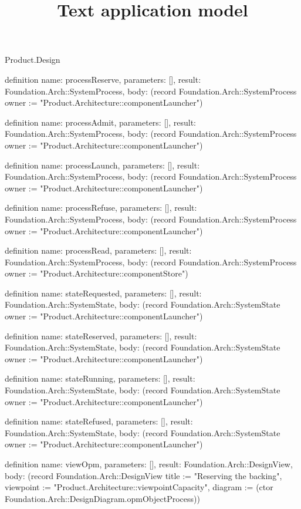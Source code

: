 \begin{lexlean}{Product.Design}
\title{Text application model}
\begin{semanticmodule}
definition{
  name: processReserve, parameters: [], result: Foundation.Arch::SystemProcess,
  body: (record Foundation.Arch::SystemProcess {owner := "Product.Architecture::componentLauncher"})
}

definition{
  name: processAdmit, parameters: [], result: Foundation.Arch::SystemProcess,
  body: (record Foundation.Arch::SystemProcess {owner := "Product.Architecture::componentLauncher"})
}

definition{
  name: processLaunch, parameters: [], result: Foundation.Arch::SystemProcess,
  body: (record Foundation.Arch::SystemProcess {owner := "Product.Architecture::componentLauncher"})
}

definition{
  name: processRefuse, parameters: [], result: Foundation.Arch::SystemProcess,
  body: (record Foundation.Arch::SystemProcess {owner := "Product.Architecture::componentLauncher"})
}

definition{
  name: processRead, parameters: [], result: Foundation.Arch::SystemProcess,
  body: (record Foundation.Arch::SystemProcess {owner := "Product.Architecture::componentStore"})
}

definition{
  name: stateRequested, parameters: [], result: Foundation.Arch::SystemState,
  body: (record Foundation.Arch::SystemState {owner := "Product.Architecture::componentLauncher"})
}

definition{
  name: stateReserved, parameters: [], result: Foundation.Arch::SystemState,
  body: (record Foundation.Arch::SystemState {owner := "Product.Architecture::componentLauncher"})
}

definition{
  name: stateRunning, parameters: [], result: Foundation.Arch::SystemState,
  body: (record Foundation.Arch::SystemState {owner := "Product.Architecture::componentLauncher"})
}

definition{
  name: stateRefused, parameters: [], result: Foundation.Arch::SystemState,
  body: (record Foundation.Arch::SystemState {owner := "Product.Architecture::componentLauncher"})
}

definition{
  name: viewOpm, parameters: [], result: Foundation.Arch::DesignView,
  body: (record Foundation.Arch::DesignView {title := "Reserving the backing", viewpoint := "Product.Architecture::viewpointCapacity", diagram := (ctor Foundation.Arch::DesignDiagram.opmObjectProcess)})
}


\end{semanticmodule}
\end{lexlean}
